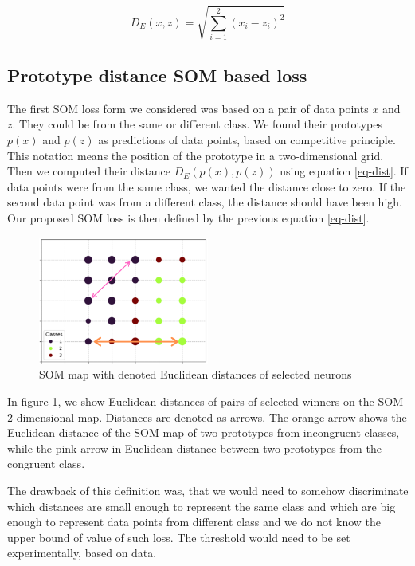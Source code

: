 \begin{equation}
    D_E(x, z) = \sqrt{\sum_{i=1}^{2} {(x_i - z_i)}^2}
    \label{eq-dist}
\end{equation}
\bigskip

\subsection{Prototype distance SOM based loss}
\label{loss-prop1}
The first SOM loss form we considered was based on a pair of data points $x$ and $z$. They could be from the same or different class. We found their prototypes $p(x)$ and $p(z)$ as predictions of data points, based on competitive principle. This notation means the position of the prototype in a two-dimensional grid. Then we computed their distance $D_E(p(x), p(z))$ using equation \ref{eq-dist}. If data points were from the same class, we wanted the distance close to zero. If the second data point was from a different class, the distance should have been high. Our proposed SOM loss is then defined by the previous equation \ref{eq-dist}.

\begin{figure}[h!]
    \centering
    \includegraphics[width=0.5\textwidth]{figs/som-with-distances.png}
    \caption{SOM map with denoted Euclidean distances of selected neurons}
    \label{fig:som-with-distances}
\end{figure}

In figure \ref{fig:som-with-distances}, we show Euclidean distances of pairs of selected winners on the SOM 2-dimensional map. Distances are denoted as arrows. The orange arrow shows the Euclidean distance of the SOM map of two prototypes from incongruent classes, while the pink arrow in Euclidean distance between two prototypes from the congruent class.

The drawback of this definition was, that we would need to somehow discriminate which distances are small enough to represent the same class and which are big enough to represent data points from different class and we do not know the upper bound of value of such loss. The threshold would need to be set experimentally, based on data.

